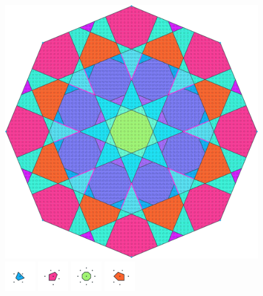 \documentclass[text.tex]{subfiles}
\begin{document}
\clearpage
\pagestyle{fancy}
\fancyhf{}
\begin{figure}[h!]
\centering
\includegraphics[width=1\textwidth]{img/results/octagon/octagon_120710_(0_1alpha_2).pdf}
\includegraphics[width=0.12\textwidth]{img/results/octagon/octagon_120710_(0_1alpha_2)_001.pdf}
\includegraphics[width=0.12\textwidth]{img/results/octagon/octagon_120710_(0_1alpha_2)_002.pdf}
\includegraphics[width=0.12\textwidth]{img/results/octagon/octagon_120710_(0_1alpha_2)_003.pdf}
\includegraphics[width=0.12\textwidth]{img/results/octagon/octagon_120710_(0_1alpha_2)_004.pdf}

\end{figure}
\end{document}
